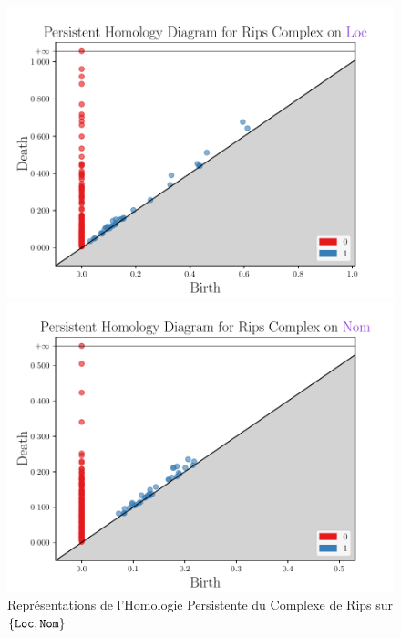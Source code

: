 \documentclass{cours}
\begin{document}
\begin{figure}[H]
\begin{minipage}{.5\textwidth}
	\begin{center}
	\includegraphics[width=\linewidth]{Figures/Visualisations/rc_Loc.pdf}
	\end{center}
\end{minipage}
\begin{minipage}{.5\textwidth}
	\begin{center}
	\includegraphics[width=\linewidth]{Figures/Visualisations/rc_Nom.pdf}
	\end{center}
\end{minipage}
\caption{Représentations de l'Homologie Persistente du Complexe de Rips sur $\{\tt Loc,Nom\}$}
\end{figure}
\end{document}
